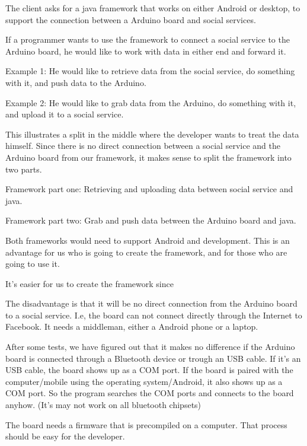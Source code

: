 
The client asks for a java framework that works on either Android or desktop, to support the connection between a Arduino board and social services.

If a programmer wants to use the framework to connect a social service to the Arduino board, he would like to work with data in either end and forward it.

Example 1:
He would like to retrieve data from the social service, do something with it, and push data to the Arduino.

Example 2:
He would like to grab data from the Arduino, do something with it, and upload it to a social service.

This illustrates a split in the middle where the developer wants to treat the data himself. Since there is no direct connection between a social service and the Arduino board from our framework, it makes sense to split the framework into two parts.

Framework part one: Retrieving and uploading data between social service and java.

Framework part two: Grab and push data between the Arduino board and java.

Both frameworks would need to support Android and development. This is an advantage for us who is going to create the framework, and for those who are going to use it.

It's easier for us to create the framework since

The disadvantage is that it will be no direct connection from the Arduino board to a social service.
I.e, the board can not connect directly through the Internet to Facebook. It needs a middleman, either a Android phone or a laptop.



After some tests, we have figured out that it makes no difference if the Arduino board is connected through a Bluetooth device or trough an USB cable. If it's an USB cable, the board shows up as a COM port. If the board is paired with the computer/mobile using the operating system/Android, it also shows up as a COM port. So the program searches the COM ports and connects to the board anyhow. (It's may not work on all bluetooth chipsets)


The board needs a firmware that is precompiled on a computer.
That process should be easy for the developer.

